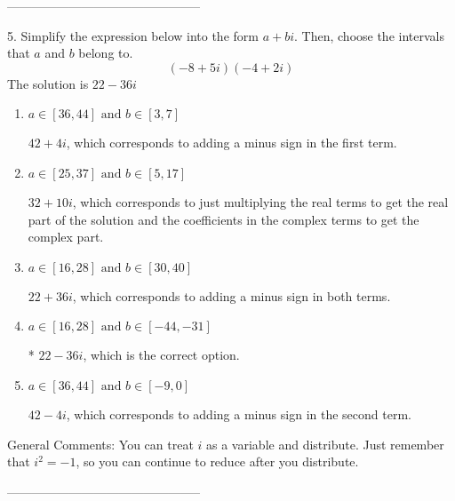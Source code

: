 \documentclass{article}[14pt]
\begin{document}
-----------------------------------------------

5. Simplify the expression below into the form $a+bi$. Then, choose the intervals that $a$ and $b$ belong to.
$$ (-8  + 5 i)(-4  + 2 i) $$ 
The solution is $ 22  - 36 i $ 

\begin{enumerate}[label=\Alph*.] 
\item $ a \in [36, 44] \text{ and } b \in [3, 7] $ 

  $42  + 4 i$, which corresponds to adding a minus sign in the first term. 
\item $ a \in [25, 37] \text{ and } b \in [5, 17] $ 

  $32  + 10 i$, which corresponds to just multiplying the real terms to get the real part of the solution and the coefficients in the complex terms to get the complex part. 
\item $ a \in [16, 28] \text{ and } b \in [30, 40] $ 

  $22  + 36 i$, which corresponds to adding a minus sign in both terms. 
\item $ a \in [16, 28] \text{ and } b \in [-44, -31] $ 

 * $22  - 36 i$, which is the correct option. 
\item $ a \in [36, 44] \text{ and } b \in [-9, 0] $ 

  $42  - 4 i$, which corresponds to adding a minus sign in the second term. 
\end{enumerate} 
 
General Comments: You can treat $i$ as a variable and distribute. Just remember that $i^2=-1$, so you can continue to reduce after you distribute.

-----------------------------------------------
\end{document}
